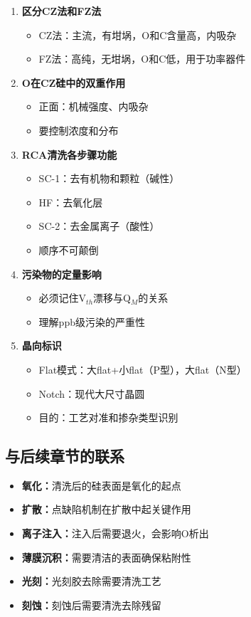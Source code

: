\documentclass[UTF8,12pt,a4paper]{ctexart}
\begin{document}
\begin{enumerate}
    \item \textbf{区分CZ法和FZ法}
    \begin{itemize}
        \item CZ法：主流，有坩埚，O和C含量高，内吸杂
        \item FZ法：高纯，无坩埚，O和C低，用于功率器件
    \end{itemize}
    
    \item \textbf{O在CZ硅中的双重作用}
    \begin{itemize}
        \item 正面：机械强度、内吸杂
        \item 要控制浓度和分布
    \end{itemize}
    
    \item \textbf{RCA清洗各步骤功能}
    \begin{itemize}
        \item SC-1：去有机物和颗粒（碱性）
        \item HF：去氧化层
        \item SC-2：去金属离子（酸性）
        \item 顺序不可颠倒
    \end{itemize}
    
    \item \textbf{污染物的定量影响}
    \begin{itemize}
        \item 必须记住V$_{th}$漂移与Q$_M$的关系
        \item 理解ppb级污染的严重性
    \end{itemize}
    
    \item \textbf{晶向标识}
    \begin{itemize}
        \item Flat模式：大flat+小flat（P型），大flat（N型）
        \item Notch：现代大尺寸晶圆
        \item 目的：工艺对准和掺杂类型识别
    \end{itemize}
\end{enumerate}

\subsection{与后续章节的联系}

\begin{itemize}
    \item \textbf{氧化：}清洗后的硅表面是氧化的起点
    \item \textbf{扩散：}点缺陷机制在扩散中起关键作用
    \item \textbf{离子注入：}注入后需要退火，会影响O析出
    \item \textbf{薄膜沉积：}需要清洁的表面确保粘附性
    \item \textbf{光刻：}光刻胶去除需要清洗工艺
    \item \textbf{刻蚀：}刻蚀后需要清洗去除残留
\end{itemize}
\end{document}
